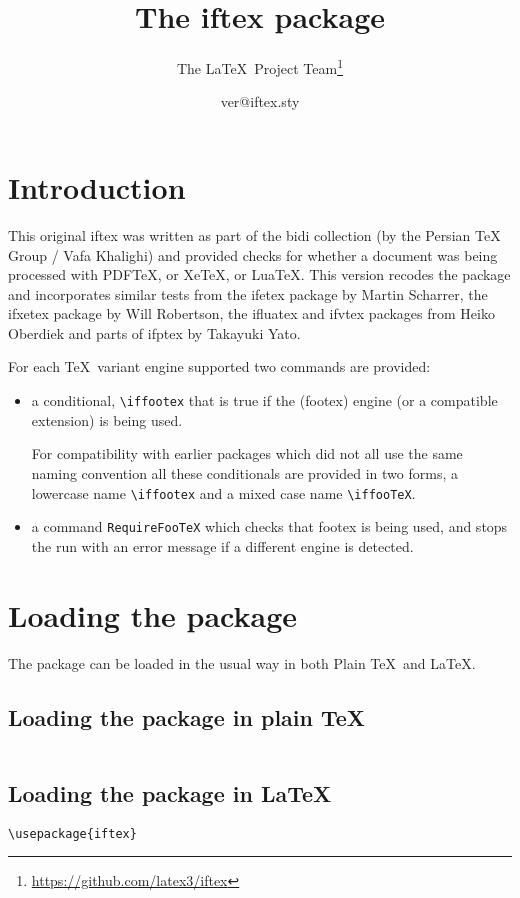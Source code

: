 \documentclass{article}
\title{The iftex package}
\author{The \LaTeX\ Project Team\thanks{%
\url{https://github.com/latex3/iftex}}}
\date{\csname ver@iftex.sty\endcsname}
\begin{document}
\maketitle
\tableofcontents


\section{Introduction}
This original \textsf{iftex} was written as part of the \textsf{bidi}
collection (by the Persian TeX Group / Vafa Khalighi)
and provided checks for whether a document was being
processed with PDF\TeX, or Xe\TeX, or Lua\TeX. This version recodes
the package and incorporates similar tests from the \textsf{ifetex}
package by Martin Scharrer, the \textsf{ifxetex} package by Will
Robertson, the \textsf{ifluatex} and \textsf{ifvtex}
packages from Heiko Oberdiek and parts of \textsf{ifptex} by Takayuki
Yato.

For each \TeX\ variant engine supported two commands are provided:
\begin{itemize}
\item
 a conditional, \verb|\iffootex| that is true if the \textsf(footex)
engine (or a compatible extension) is being used.

For compatibility with earlier packages which did not all use the same
naming convention all these conditionals are provided in two forms, a
lowercase name \verb|\iffootex| and a mixed case name \verb|\iffooTeX|.

\item a command \verb|RequireFooTeX| which checks that \textsf{footex}
  is being used, and stops the run with an error message if a
  different engine is detected.
\end{itemize}

\section{Loading the package}
The package can be loaded in the usual way in both Plain \TeX\ and \LaTeX.
\subsection{Loading the package in plain \TeX}
\begin{verbatim}

\end{verbatim}

\subsection{Loading the package in \LaTeX}
\begin{verbatim}
\usepackage{iftex}
\end{verbatim}
\end{document}
